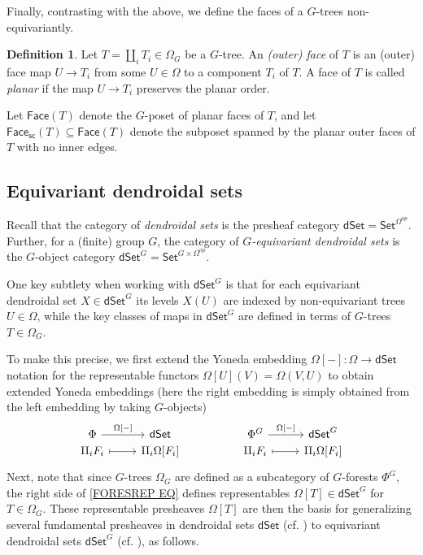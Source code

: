 \documentclass[a4paper,10pt
,draft
]{article}%
\numberwithin{equation}{section}
\numberwithin{figure}{section}
\theoremstyle{definition} %
\newtheorem{definition}[equation]{Definition}%
\newcommand{\1}{\ensuremath{\mathbbm 1}}%
\begin{document}
Finally, contrasting with the above, we define the faces of a $G$-trees non-equivariantly.

\begin{definition}
	Let $T = \amalg_i T_i \in \Omega_G$ be a $G$-tree.
	An \textit{(outer) face} of $T$ is an (outer) face map $U \to T_i$ from some $U \in \Omega$ to a component $T_i$ of $T$.
	A face of $T$ is called \textit{planar} if the map $U \to T_i$ preserves the planar order.

	Let $\mathsf{Face}(T)$ denote the $G$-poset of planar faces of $T$,
	and let $\mathsf{Face}_{\mathsf{sc}}(T) \subseteq \mathsf{Face}(T)$ denote the subposet spanned by the planar outer faces of $T$ with no inner edges.
\end{definition}





\subsection{Equivariant dendroidal sets}
\label{EDS_SEC}

Recall that the category of \emph{dendroidal sets}
is the presheaf category
$\mathsf{dSet} = \mathsf{Set}^{\Omega^{op}}$.
Further, for a (finite) group $G$,
the category of
\emph{$G$-equivariant dendroidal sets}
is the $G$-object category
$\mathsf{dSet}^G = \mathsf{Set}^{G \times \Omega^{op}}$.


One key subtlety when working with 
$\mathsf{dSet}^G$
is that for each equivariant dendroidal set 
$X \in \mathsf{dSet}^G$
its levels $X(U)$ are indexed by
non-equivariant trees $U \in \Omega$,
while the key classes of maps in $\mathsf{dSet}^G$ are defined in terms
of $G$-trees $T \in \Omega_G$.

To make this precise, 
we first extend the Yoneda embedding
$\Omega[-]\colon \Omega \to \mathsf{dSet}$
notation
for the representable functors
$\Omega[U](V) = \Omega(V,U)$
to obtain extended Yoneda embeddings
(here the right embedding is simply obtained from the left embedding by taking $G$-objects)
\begin{equation}\label{FORESREP EQ}
\begin{tikzcd}[row sep=0]
	\Phi \ar{r}{\Omega[-]}
&
	\mathsf{dSet}
&&%
	\Phi^G \ar{r}{\Omega[-]}
&
	\mathsf{dSet}^G
\\
	\amalg_i F_i
	\ar[mapsto]{r}
&
	\amalg_i \Omega[F_i]
&&%
	\amalg_i F_i
	\ar[mapsto]{r}
&
	\amalg_i \Omega[F_i]
\end{tikzcd}
\end{equation}
Next, note that since $G$-trees $\Omega_G$
are defined as a subcategory of $G$-forests $\Phi^G$,
the right side of 
\eqref{FORESREP EQ}
defines representables 
$\Omega[T] \in \mathsf{dSet}^G$
for $T \in \Omega_G$.
These representable presheaves 
$\Omega[T]$
are then the basis for
generalizing several fundamental
presheaves in dendroidal sets $\mathsf{dSet}$
(cf. \cite[\S 2]{CM13a})
to equivariant dendroidal sets
$\mathsf{dSet}^G$
(cf. \cite[\S 6]{Per18}),
as follows.
\end{document}
